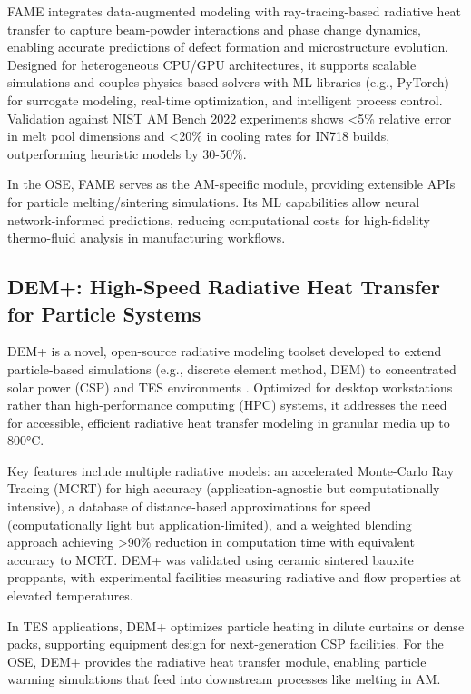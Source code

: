 \documentclass[11pt]{article}
\begin{document}
FAME integrates data-augmented modeling with ray-tracing-based radiative heat transfer to capture beam-powder interactions and phase change dynamics, enabling accurate predictions of defect formation and microstructure evolution. Designed for heterogeneous CPU/GPU architectures, it supports scalable simulations and couples physics-based solvers with ML libraries (e.g., PyTorch) for surrogate modeling, real-time optimization, and intelligent process control. Validation against NIST AM Bench 2022 experiments shows <5\% relative error in melt pool dimensions and <20\% in cooling rates for IN718 builds, outperforming heuristic models by 30-50\%.

In the OSE, FAME serves as the AM-specific module, providing extensible APIs for particle melting/sintering simulations. Its ML capabilities allow neural network-informed predictions, reducing computational costs for high-fidelity thermo-fluid analysis in manufacturing workflows.

\subsection*{DEM+: High-Speed Radiative Heat Transfer for Particle Systems}
\noindent
DEM+ is a novel, open-source radiative modeling toolset developed to extend particle-based simulations (e.g., discrete element method, DEM) to concentrated solar power (CSP) and TES environments \cite{schraderDevelopmentExperimentalOptimization2024}. Optimized for desktop workstations rather than high-performance computing (HPC) systems, it addresses the need for accessible, efficient radiative heat transfer modeling in granular media up to 800°C.

Key features include multiple radiative models: an accelerated Monte-Carlo Ray Tracing (MCRT) for high accuracy (application-agnostic but computationally intensive), a database of distance-based approximations for speed (computationally light but application-limited), and a weighted blending approach achieving >90\% reduction in computation time with equivalent accuracy to MCRT. DEM+ was validated using ceramic sintered bauxite proppants, with experimental facilities measuring radiative and flow properties at elevated temperatures.

In TES applications, DEM+ optimizes particle heating in dilute curtains or dense packs, supporting equipment design for next-generation CSP facilities. For the OSE, DEM+ provides the radiative heat transfer module, enabling particle warming simulations that feed into downstream processes like melting in AM.
\end{document}
